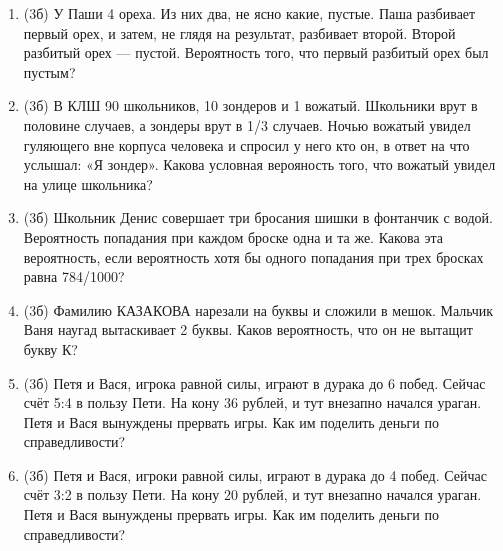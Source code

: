 \documentclass[a4paper, 12pt]{article}
\begin{document}
\begin{enumerate}
\item (3б) У Паши 4 ореха. Из них два, не ясно какие, пустые. Паша разбивает первый орех, и затем, не глядя на результат, разбивает второй. Второй разбитый орех — пустой. Вероятность того, что первый разбитый орех был пустым?
\item (3б) В КЛШ 90 школьников, 10 зондеров и 1 вожатый. Школьники врут
в половине случаев, а зондеры врут в 1/3 случаев. Ночью вожатый увидел
гуляющего вне корпуса человека и спросил у него кто он,
в ответ на что услышал: «Я зондер».
Какова условная верояность того, что вожатый увидел на улице школьника?
\item (3б) Школьник Денис совершает три бросания шишки в фонтанчик с водой.
Вероятность попадания при каждом броске одна и та же.
Какова эта вероятность, если вероятность хотя бы одного попадания при трех бросках равна 784/1000?
\item (3б) Фамилию КАЗАКОВА нарезали на буквы и сложили в мешок.
Мальчик Ваня наугад вытаскивает 2 буквы. Каков вероятность, что он не вытащит букву К?
\item (3б) Петя и Вася, игрока равной силы, играют в дурака до 6 побед. Сейчас счёт 5:4 в пользу Пети.
На кону 36 рублей, и тут внезапно начался ураган. Петя и Вася вынуждены прервать игры.
Как им поделить деньги по справедливости?
\item (3б) Петя и Вася, игроки равной силы, играют в дурака до 4 побед. Сейчас счёт 3:2 в пользу Пети.
На кону 20 рублей, и тут внезапно начался ураган. Петя и Вася вынуждены прервать игры.
Как им поделить деньги по справедливости?

\end{enumerate}
\end{document}
